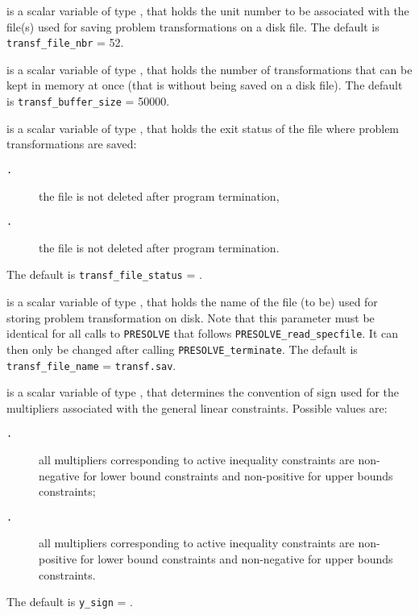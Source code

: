 \documentclass{galahad}
\newcommand{\packagename}{PRESOLVE}
\newcommand{\sym}{\tt\small}
\begin{document}
\begin{description}
 is a scalar variable of type \integer, that
holds the unit number to be associated with the file(s) used
for saving problem transformations on a disk file.
The default is {\tt transf\_file\_nbr} = 52.

 is a scalar variable of type \integer, that
holds the number of transformations that can be kept in memory
at once (that is without being saved on a disk file).
The default is {\tt transf\_buffer\_size} = 50000.

 is a scalar variable of type \integer, that
holds the exit status of the file where problem transformations are saved:
\begin{description}
\item[\sym \galsymkeep.] the file is not deleted after program termination,
\item[\sym \galsymdelete.] the file is not deleted after program termination.
\end{description}
The default is {\tt transf\_file\_status} = {\sym \galsymkeep}.

 is a scalar variable of type \integer, that
holds the name of the file (to be) used for storing problem transformation on
disk. Note that this parameter must be identical for all calls to
{\tt \packagename} that follows {\tt \packagename\_read\_specfile}. It can
then only be changed after calling {\tt \packagename\_terminate}.
The default is {\tt transf\_file\_name} = {\tt transf.sav}.

 is a scalar variable of type \integer, that
determines the convention of sign used for the multipliers
associated with the general linear constraints. Possible values are:
\begin{description}
\item[\sym \galsympositive.] all multipliers corresponding to active
                inequality constraints are non-negative for
                lower bound constraints and non-positive for
                upper bounds constraints;
\item[\sym \galsymnegative.] all multipliers corresponding to active
                inequality constraints are non-positive for
                lower bound constraints and non-negative for
                upper bounds constraints.
\end{description}
The default is {\tt y\_sign} = {\sym \galsympositive}.


\end{description}
\end{document}
